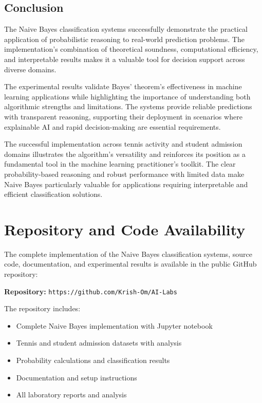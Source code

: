 \documentclass[11pt,a4paper]{article}
\begin{document}
\subsection{Conclusion}

The Naive Bayes classification systems successfully demonstrate the practical application of probabilistic reasoning to real-world prediction problems. The implementation's combination of theoretical soundness, computational efficiency, and interpretable results makes it a valuable tool for decision support across diverse domains.

The experimental results validate Bayes' theorem's effectiveness in machine learning applications while highlighting the importance of understanding both algorithmic strengths and limitations. The systems provide reliable predictions with transparent reasoning, supporting their deployment in scenarios where explainable AI and rapid decision-making are essential requirements.

The successful implementation across tennis activity and student admission domains illustrates the algorithm's versatility and reinforces its position as a fundamental tool in the machine learning practitioner's toolkit. The clear probability-based reasoning and robust performance with limited data make Naive Bayes particularly valuable for applications requiring interpretable and efficient classification solutions.

\section{Repository and Code Availability}

The complete implementation of the Naive Bayes classification systems, source code, documentation, and experimental results is available in the public GitHub repository:

\textbf{Repository:} \texttt{https://github.com/Krish-Om/AI-Labs}

The repository includes:
\begin{itemize}
\item Complete Naive Bayes implementation with Jupyter notebook
\item Tennis and student admission datasets with analysis
\item Probability calculations and classification results
\item Documentation and setup instructions
\item All laboratory reports and analysis
\end{itemize}
\end{document}
